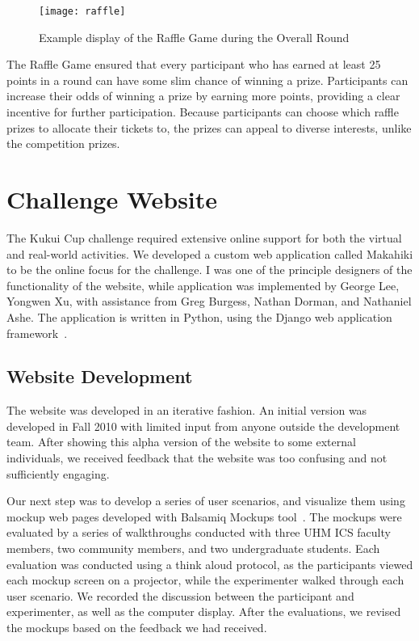 \begin{figure}[htbp]
	\centering
		\texttt{[image: raffle]}
		\caption{Example display of the Raffle Game during the Overall Round}
\label{fig:raffle-game}
\end{figure}

The Raffle Game ensured that every participant who has earned at least 25 points in a round can have some slim chance of winning a prize. Participants can increase their odds of winning a prize by earning more points, providing a clear incentive for further participation. Because participants can choose which raffle prizes to allocate their tickets to, the prizes can appeal to diverse interests, unlike the competition prizes.

\section{Challenge Website}
\label{sec:challenge-website}

The Kukui Cup challenge required extensive online support for both the virtual and real-world activities. We developed a custom web application called Makahiki to be the online focus for the challenge. I was one of the principle designers of the functionality of the website, while application was implemented by George Lee, Yongwen Xu, with assistance from Greg Burgess, Nathan Dorman, and Nathaniel Ashe. The application is written in Python, using the Django web application framework~\cite{django-website}.

\subsection{Website Development}

The website was developed in an iterative fashion. An initial version was developed in Fall 2010 with limited input from anyone outside the development team. After showing this alpha version of the website to some external individuals, we received feedback that the website was too confusing and not sufficiently engaging.

Our next step was to develop a series of user scenarios, and visualize them using mockup web pages developed with Balsamiq Mockups tool~\cite{balsamiq-website}. The mockups were evaluated by a series of walkthroughs conducted with three UHM ICS faculty members, two community members, and two undergraduate students. Each evaluation was conducted using a think aloud protocol, as the participants viewed each mockup screen on a projector, while the experimenter walked through each user scenario. We recorded the discussion between the participant and experimenter, as well as the computer display. After the evaluations, we revised the mockups based on the feedback we had received.

